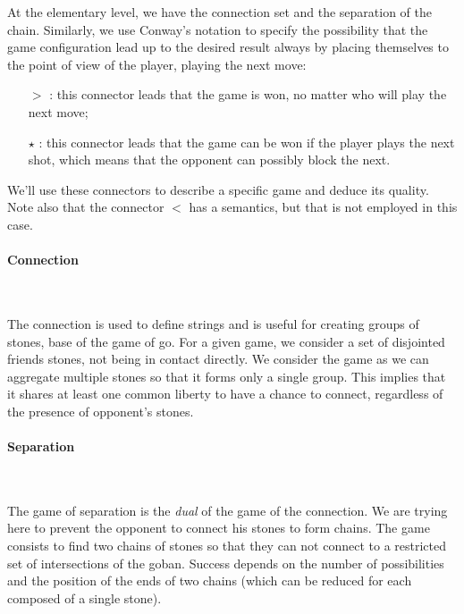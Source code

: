 \documentclass[a4paper,10pt,twoside]{report}
\begin{document}
	At the elementary level, we have the connection set and the separation of the chain. Similarly, we use Conway's notation to specify the possibility that the game configuration lead up to the desired result always by placing themselves to the point of view of the player, playing the next move:
	\vspace{3mm}
	
	\begin{itemize}
		\item[$>$]{ : this connector leads that the game is won, no matter who will play the next move;}
		\vspace{1mm}
		\item[$\star$]{ : this connector leads that the game can be won if the player plays the next shot, which means that the opponent can possibly block the next.}
		\vspace{3mm}
	\end{itemize}

	We'll use these connectors to describe a specific game and deduce its quality. Note also that the connector $<$ has a semantics, but that is not employed in this case.

	\paragraph{Connection}
	~~\vspace{2mm}
	
	The connection is used to define strings and is useful for creating groups of stones, base of the game of go. For a given game, we consider a set of disjointed friends stones, not being in contact directly. We consider the game as we can aggregate multiple stones so that it forms only a single group. This implies that it shares at least one common liberty to have a chance to connect, regardless of the presence of opponent's stones.
	
	\paragraph{Separation}
	~~\vspace{2mm}

	The game of separation is the \emph{dual} of the game of the connection. We are trying here to prevent the opponent to connect his stones to form chains. The game consists to find two chains of stones so that they can not connect to a restricted set of intersections of the goban. Success depends on the number of possibilities and the position of the ends of two chains (which can be reduced for each composed of a single stone).\\
\end{document}
